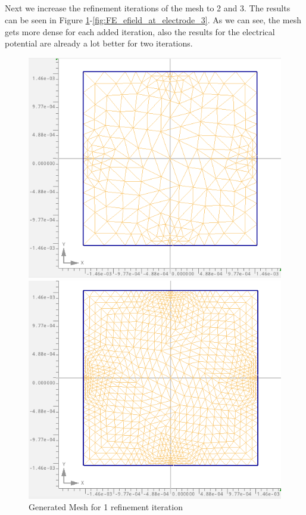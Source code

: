 \documentclass{article}
\begin{document}
    \subsection{}

    Next we increase the refinement iterations of the mesh to 2 and 3.
    The results can be seen in Figure \ref{fig:FE_mesh_1_1}-\ref{fig:FE_efield_at_electrode_3}.
    As we can see, the mesh gets more dense for each added iteration, also the results for the electrical potential are already a lot better for two iterations.

    \begin{figure}[htbp]
        \centering
        \begin{minipage}[b]{0.3\textwidth}
            \includegraphics[width=\textwidth]{FE_mesh_1}
            \caption{Generated Mesh for 1 refinement iteration}
            \label{fig:FE_mesh_1_1}
        \end{minipage}
        \hfill
        \begin{minipage}[b]{0.3\textwidth}
            \includegraphics[width=\textwidth]{FE_mesh_2}

\end{minipage}
\end{figure}
\end{document}
